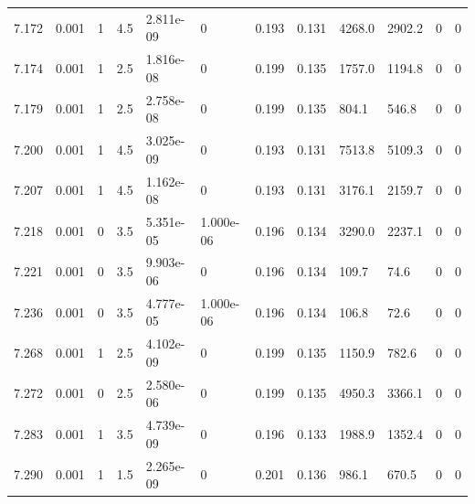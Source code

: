 \documentclass[preview]{standalone}
\begin{document}
{{{{{{{\begin{tabular}{L{1.2cm}C{1.2cm} C{0.3cm}C{0.5cm} C{1.4cm}C{1.4cm} C{1.4cm}C{1.4cm} C{1.6cm}C{1.6cm} C{1.6cm}C{1.6cm}}
  7.172  &  0.001  & 1     & 4.5 &  2.811e-09  & 0  &  0.193&   0.131& 4268.0 & 2902.2   &  0 & 0  \\ 
  7.174  &  0.001  & 1     & 2.5 &  1.816e-08  & 0  &  0.199&   0.135& 1757.0 & 1194.8   &  0 & 0  \\ 
  7.179  &  0.001  & 1     & 2.5 &  2.758e-08  & 0  &  0.199&   0.135& 804.1 & 546.8   &  0 & 0  \\ 
  7.200  &  0.001  & 1     & 4.5 &  3.025e-09  & 0  &  0.193&   0.131& 7513.8 & 5109.3   &  0 & 0  \\ 
  7.207  &  0.001  & 1     & 4.5 &  1.162e-08  & 0  &  0.193&   0.131& 3176.1 & 2159.7   &  0 & 0  \\ 
  7.218  &  0.001  & 0     & 3.5 &  5.351e-05  & 1.000e-06  &  0.196&   0.134& 3290.0 & 2237.1   &  0 & 0  \\ 
  7.221  &  0.001  & 0     & 3.5 &  9.903e-06  & 0  &  0.196&   0.134& 109.7 & 74.6   &  0 & 0  \\ 
  7.236  &  0.001  & 0     & 3.5 &  4.777e-05  & 1.000e-06  &  0.196&   0.134& 106.8 & 72.6   &  0 & 0  \\ 
  7.268  &  0.001  & 1     & 2.5 &  4.102e-09  & 0  &  0.199&   0.135& 1150.9 & 782.6   &  0 & 0  \\ 
  7.272  &  0.001  & 0     & 2.5 &  2.580e-06  & 0  &  0.199&   0.135& 4950.3 & 3366.1   &  0 & 0  \\ 
  7.283  &  0.001  & 1     & 3.5 &  4.739e-09  & 0  &  0.196&   0.133& 1988.9 & 1352.4   &  0 & 0  \\ 
  7.290  &  0.001  & 1     & 1.5 &  2.265e-09  & 0  &  0.201&   0.136& 986.1 & 670.5   &  0 & 0  \\ 
\hline 
\end{tabular} 

}}}}}}}
\end{document}
